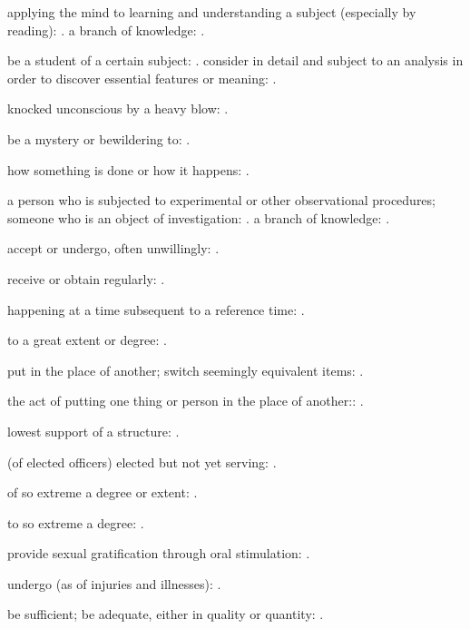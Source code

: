   applying the mind to learning and understanding a subject (especially by reading): . a branch of knowledge: .

  be a student of a certain subject: . consider in detail and subject to an analysis in order to discover essential features or meaning: .

  knocked unconscious by a heavy blow: .

  be a mystery or bewildering to: .

  how something is done or how it happens: .

  a person who is subjected to experimental or other observational procedures; someone who is an object of investigation: . a branch of knowledge: .

  accept or undergo, often unwillingly: .

  receive or obtain regularly: .

  happening at a time subsequent to a reference time: .

  to a great extent or degree: .

  put in the place of another; switch seemingly equivalent items: .

  the act of putting one thing or person in the place of another:: .

  lowest support of a structure: .

  (of elected officers) elected but not yet serving: .

  of so extreme a degree or extent: .

  to so extreme a degree: .

  provide sexual gratification through oral stimulation: .

  undergo (as of injuries and illnesses): .

  be sufficient; be adequate, either in quality or quantity: .

